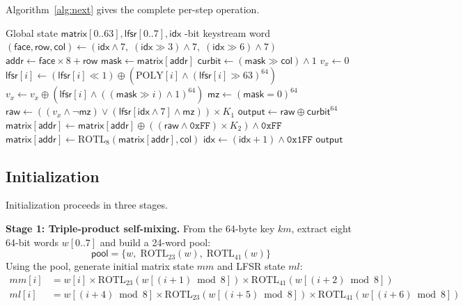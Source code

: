 \documentclass[11pt,a4paper]{article}
\begin{document}
Algorithm~\ref{alg:next} gives the complete per-step operation.

\begin{algorithm}[H]
\caption{Single-step keystream generation $\mathsf{next}()$}
\label{alg:next}
\begin{algorithmic}[1]
\Require Global state $\mathsf{matrix}[0..63], \mathsf{lfsr}[0..7], \mathsf{idx}$
-bit keystream word
\State $(\mathsf{face}, \mathsf{row}, \mathsf{col}) \gets (\mathsf{idx} \land 7,\; (\mathsf{idx} \gg 3) \land 7,\; (\mathsf{idx} \gg 6) \land 7)$
\State $\mathsf{addr} \gets \mathsf{face} \times 8 + \mathsf{row}$
\State $\mathsf{mask} \gets \mathsf{matrix}[\mathsf{addr}]$
\State $\mathsf{curbit} \gets (\mathsf{mask} \gg \mathsf{col}) \land 1$
\State $v_x \gets 0$
    \State $\mathsf{lfsr}[i] \gets (\mathsf{lfsr}[i] \ll 1) \oplus (\mathrm{POLY}[i] \land (\mathsf{lfsr}[i] \gg 63)^{64})$
    \State $v_x \gets v_x \oplus (\mathsf{lfsr}[i] \land ((\mathsf{mask} \gg i) \land 1)^{64})$
\EndFor
\State $\mathsf{mz} \gets (\mathsf{mask} = 0)^{64}$ 
\State $\mathsf{raw} \gets ((v_x \land \lnot\mathsf{mz}) \lor (\mathsf{lfsr}[\mathsf{idx} \land 7] \land \mathsf{mz})) \times K_1$
\State $\mathsf{output} \gets \mathsf{raw} \oplus \mathsf{curbit}^{64}$
\State $\mathsf{matrix}[\mathsf{addr}] \gets \mathsf{matrix}[\mathsf{addr}] \oplus ((\mathsf{raw} \land \mathtt{0xFF}) \times K_2) \land \mathtt{0xFF}$
\State $\mathsf{matrix}[\mathsf{addr}] \gets \mathrm{ROTL}_8(\mathsf{matrix}[\mathsf{addr}], \mathsf{col})$
\State $\mathsf{idx} \gets (\mathsf{idx} + 1) \land \mathtt{0x1FF}$
\State \Return $\mathsf{output}$
\end{algorithmic}
\end{algorithm}

\subsection{Initialization}

Initialization proceeds in three stages.

\textbf{Stage 1: Triple-product self-mixing.} From the 64-byte key $km$,
extract eight 64-bit words $w[0..7]$ and build a 24-word pool:
\[
\mathsf{pool} = \{w,\; \mathrm{ROTL}_{23}(w),\; \mathrm{ROTL}_{41}(w)\}
\]
Using the pool, generate initial matrix state $mm$ and LFSR state $ml$:
\begin{equation}
\begin{aligned}
mm[i] &= w[i] \times \mathrm{ROTL}_{23}(w[(i+1)\bmod 8]) \times \mathrm{ROTL}_{41}(w[(i+2)\bmod 8]) \\
ml[i] &= w[(i+4)\bmod 8] \times \mathrm{ROTL}_{23}(w[(i+5)\bmod 8]) \times \mathrm{ROTL}_{41}(w[(i+6)\bmod 8])
\end{aligned}
\end{equation}
\end{document}
